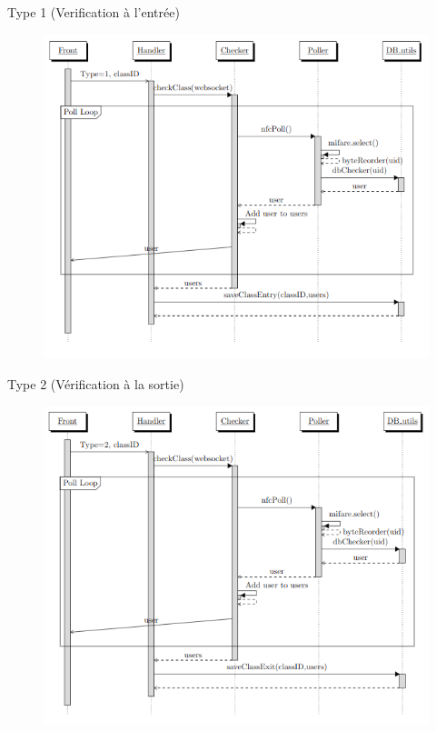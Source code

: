\documentclass[aspectratio=169]{beamer}
\begin{document}
\begin{frame}{Type 1 (Verification à l'entrée)}
  \begin{figure}[]
    \includegraphics[height=\textheight]{../assets/nfcSeqEntry.png}
  \end{figure}

\end{frame}

\begin{frame}{Type 2 (Vérification à la sortie)}
  \begin{figure}[]
    \includegraphics[height=\textheight]{../assets/nfcSeqExit.png}
  \end{figure}

\end{frame}
\end{document}
